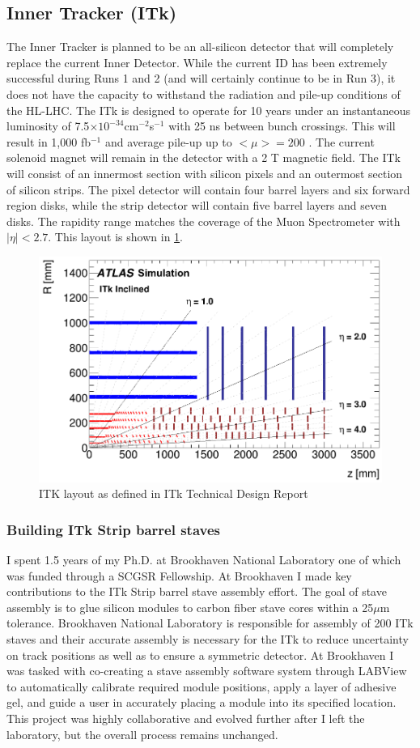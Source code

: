 \subsection{Inner Tracker (ITk)}
The Inner Tracker is planned to be an all-silicon detector that will completely replace the current Inner Detector.  While the current ID has been extremely successful during Runs 1 and 2 (and will certainly continue to be in Run 3), it does not have the capacity to withstand the radiation and pile-up conditions of the HL-LHC. The ITk is designed to operate for 10 years under an instantaneous luminosity of 7.5$\times10^{-34}$cm$^{-2}$s$^{-1}$ with 25 ns between bunch crossings. This will result in 1,000 fb$^{-1}$ and average pile-up up to $<\mu>=200$ \cite{ITktech}. The current solenoid magnet will remain in the detector with a 2 T magnetic field. The ITk will consist of an innermost section with silicon pixels and an outermost section of silicon strips. The pixel detector will contain four barrel layers and six forward region disks, while the strip detector will contain five barrel layers and seven disks. The rapidity range matches the coverage of the Muon Spectrometer with $|\eta|<2.7$. This layout is shown in \ref{fig:ITklayout}. 
\begin{figure}[!h]
        \centering
    \includegraphics[width=.6\textwidth]{Pictures/ITklayout.png}
    \caption{ ITK layout as defined in ITk Technical Design Report \cite{ITktech}}
    \label{fig:ITklayout}
\end{figure}

\subsubsection{Building ITk Strip barrel staves}
I spent 1.5 years of my Ph.D. at Brookhaven National Laboratory one of which was funded through a SCGSR Fellowship. At Brookhaven I made key contributions to the ITk Strip barrel stave assembly effort. The goal of stave assembly is to glue silicon modules to carbon fiber stave cores within a 25$\mu$m tolerance. Brookhaven National Laboratory is responsible for assembly of 200 ITk staves and their accurate assembly is necessary for the ITk to reduce uncertainty on track positions as well as to ensure a symmetric detector. At Brookhaven I was tasked with co-creating a stave assembly software system through LABView to automatically calibrate required module positions, apply a layer of adhesive gel, and guide a user in accurately placing a module into its specified location. This project was highly collaborative and evolved further after I left the laboratory, but the overall process remains unchanged.

